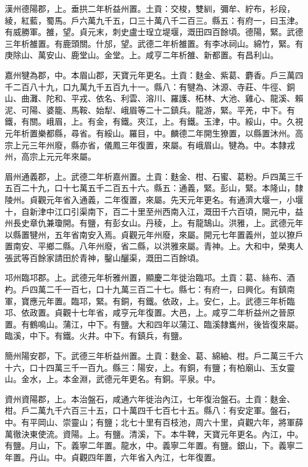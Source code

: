 \begin{pinyinscope}
 漢州德陽郡，上。垂拱二年析益州置。土貢：交梭，雙紃，彌牟、紵布，衫段，綾，紅藍，蜀馬。戶六萬九千五，口三十萬八千二百三。縣五：有府一，曰玉津。有威勝軍。雒，望。貞元末，刺史盧士珵立堤堰，溉田四百餘頃。德陽，緊。武德三年析雒置。有鹿頭關。什邡，望。武德二年析雒置。有李冰祠山。綿竹，緊。有庚除山、萬安山、鹿堂山。金堂。上。咸亨二年析雒、新都置。有昌利山。



 嘉州犍為郡，中。本眉山郡，天寶元年更名。土貢：麩金、紫葛、麝香。戶三萬四千二百八十九，口九萬九千五百九十一。縣八：有犍為、沐源、寺莊、牛徑、銅山、曲灘、陀和、平戎、依名、利雲、溶川、羅護、柘林、大池、雞心、龍溪、賴泥、可陽、婆籠、馬鞍、始犁、峨眉等二十二鎮兵。龍游，緊。平羌，中下。有鐵，有關。峨眉，上。有金，有鐵。夾江，上。有鐵。玉津，中。綏山，中。久視元年析置樂都縣，尋省。有綏山。羅目，中。麟德二年開生獠置，以縣置沐州。高宗上元三年州廢，縣亦省，儀鳳三年復置，來屬。有峨眉山。犍為。中。本隸戎州，高宗上元元年來屬。



 眉州通義郡，上。武德二年析嘉州置。土貢：麩金、柑、石蜜、葛粉。戶四萬三千五百二十九，口十七萬五千二百五十六。縣五：通義，緊。彭山，緊。本隆山，隸陵州。貞觀元年省入通義，二年復置，來屬。先天元年更名。有通濟大堰一，小堰十，自新津中江口引渠南下，百二十里至州西南入江，溉田千六百頃，開元中，益州長史章仇兼瓊開。有鹽，有彭女山。丹稜，上。有龍鵠山。洪雅，上。武德元年以縣置犍州，五年省南安入焉。貞觀元年州廢，來屬。開元七年置義州，並以獠戶置南安、平鄉二縣。八年州廢，省二縣，以洪雅來屬。青神。上。大和中，榮夷人張武等百餘家請田於青神，鑿山釃渠，溉田二百餘頃。



 邛州臨邛郡。上。武德元年析雅州置，顯慶二年徙治臨邛。土貢：葛、絲布、酒杓。戶四萬二千一百七，口十九萬三百二十七。縣七：有府一，曰興化。有鎮南軍，寶應元年置。臨邛，緊。有銅，有鐵。依政，上。安仁，上。武德三年析臨邛、依政置。貞觀十七年省，咸亨元年復置。大邑，上。咸亨二年析益州之晉原置。有鶴鳴山。蒲江，中下。有鹽。大和四年以蒲江、臨溪隸巂州，後皆復來屬。臨溪，中下。有鐵。火井。中下。有鎮兵，有鹽。



 簡州陽安郡，下。武德三年析益州置。土貢：麩金、葛、綿紬、柑。戶二萬三千六十六，口十四萬三千一百九。縣三：陽安，上。有銅，有鹽；有柏廟山、玉女靈山。金水，上。本金淵，武德元年更名。有銅。平泉。中。



 資州資陽郡，上。本治盤石，咸通六年徙治內江，七年復治盤石。土貢：麩金、柑。戶二萬九千六百三十五，口十萬四千七百七十五。縣八：有安定軍。盤石，中。有平岡山、崇靈山；有鹽；北七十里有百枝池，周六十里，貞觀六年，將軍薛萬徹決東使流。資陽。上。有鹽。清溪，下。本牛鞞，天寶元年更名。內江，中。有鹽。月山，下。義寧二年置。龍水，中。義寧二年置。有鹽。銀山，下。義寧二年置。丹山。中。貞觀四年置，六年省入內江，七年復置。




\end{pinyinscope}
